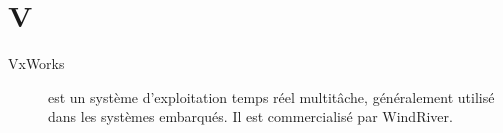  \section{V}

\begin{description}

    \item[VxWorks] est un système d'exploitation temps réel multitâche, 
	généralement utilisé dans les systèmes embarqués. Il est commercialisé par
	WindRiver.

\end{description}
